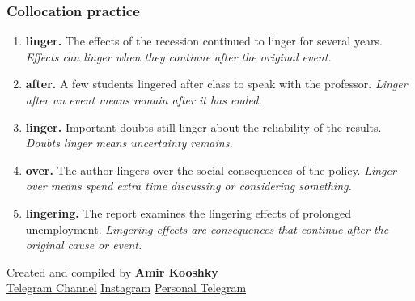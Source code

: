 \documentclass[11pt]{article}
\begin{document}
\subsubsection{Collocation practice}
\begin{enumerate}
  \item \textbf{linger.} The effects of the recession continued to linger for several years. \emph{Effects can linger when they continue after the original event.}
  \item \textbf{after.} A few students lingered after class to speak with the professor. \emph{Linger after an event means remain after it has ended.}
  \item \textbf{linger.} Important doubts still linger about the reliability of the results. \emph{Doubts linger means uncertainty remains.}
  \item \textbf{over.} The author lingers over the social consequences of the policy. \emph{Linger over means spend extra time discussing or considering something.}
  \item \textbf{lingering.} The report examines the lingering effects of prolonged unemployment. \emph{Lingering effects are consequences that continue after the original cause or event.}
\end{enumerate}

\vfill
\begin{center}
\small\color{Muted} Created and compiled by \textbf{Amir Kooshky}\\
\href{https://t.me/KooshkyTOEFL}{Telegram Channel}\quad\textbullet\quad
\href{https://www.instagram.com/kooshkytoefl}{Instagram}\quad\textbullet\quad
\href{https://t.me/KooshkyTOEFL\_pv}{Personal Telegram}
\end{center}
\end{document}
